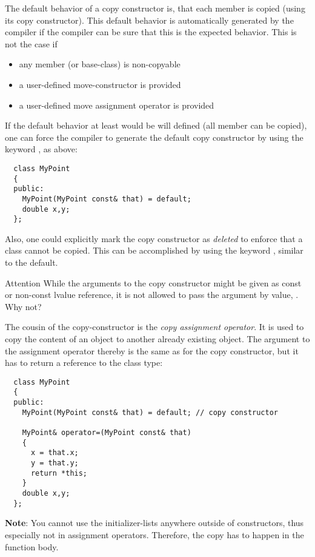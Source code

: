 The default behavior of a copy constructor is, that each member is copied (using its copy constructor). This default behavior is automatically generated
by the compiler if the compiler can be sure that this is the expected behavior. This is not the case if
\begin{itemize}
  \item any member (or base-class) is non-copyable
  \item a user-defined move-constructor is provided
  \item a user-defined move assignment operator is provided
\end{itemize}

If the default behavior at least would be will defined (\ie all member can be copied), one can force the compiler to generate the default copy constructor
by using the keyword , as above:
%
\begin{verbatim}
  class MyPoint
  {
  public:
    MyPoint(MyPoint const& that) = default;
    double x,y;
  };
\end{verbatim}

Also, one could explicitly mark the copy constructor as \emph{deleted} to enforce that a class cannot be copied. This can be accomplished by using the
keyword , similar to the default.

\begin{guideline}{Attention}
  While the arguments to the copy constructor might be given as const or non-const lvalue reference, it is not allowed to pass the argument by value, \eg
  . Why not?
\end{guideline}

The cousin of the copy-constructor is the \emph{copy assignment operator}. It is used to copy the content of an object to another already existing object.
The argument to the assignment operator thereby is the same as for the copy constructor, but it has to return a reference to the class type:
%
\begin{verbatim}
  class MyPoint
  {
  public:
    MyPoint(MyPoint const& that) = default; // copy constructor

    MyPoint& operator=(MyPoint const& that)
    {
      x = that.x;
      y = that.y;
      return *this;
    }
    double x,y;
  };
\end{verbatim}

\textbf{Note}: You cannot use the initializer-lists anywhere outside of constructors, thus especially not in assignment operators. Therefore, the copy has to
happen in the function body.

